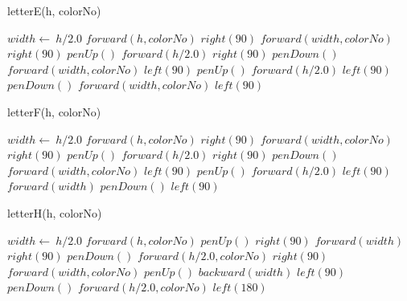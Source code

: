 \documentclass[a4paper,10pt]{article}
\begin{document}
\begin{algorithm}
\caption{letterE(h, colorNo)}
\begin{algorithmic}[5]

\STATE {}
\STATE {}
  \STATE \(width\gets\ h/2.0\)
  \STATE \(forward(h,colorNo)\)
  \STATE \(right(90)\)
  \STATE \(forward(width,colorNo)\)
  \STATE \(right(90)\)
  \STATE \(penUp()\)
  \STATE \(forward(h/2.0)\)
  \STATE \(right(90)\)
  \STATE \(penDown()\)
  \STATE \(forward(width,colorNo)\)
  \STATE \(left(90)\)
  \STATE \(penUp()\)
  \STATE \(forward(h/2.0)\)
  \STATE \(left(90)\)
  \STATE \(penDown()\)
  \STATE \(forward(width,colorNo)\)
  \STATE \(left(90)\)

\end{algorithmic}
\end{algorithm}


\begin{algorithm}
\caption{letterF(h, colorNo)}
\begin{algorithmic}[5]

\STATE {}
\STATE {}
  \STATE \(width\gets\ h/2.0\)
  \STATE \(forward(h,colorNo)\)
  \STATE \(right(90)\)
  \STATE \(forward(width,colorNo)\)
  \STATE \(right(90)\)
  \STATE \(penUp()\)
  \STATE \(forward(h/2.0)\)
  \STATE \(right(90)\)
  \STATE \(penDown()\)
  \STATE \(forward(width,colorNo)\)
  \STATE \(left(90)\)
  \STATE \(penUp()\)
  \STATE \(forward(h/2.0)\)
  \STATE \(left(90)\)
  \STATE \(forward(width)\)
  \STATE \(penDown()\)
  \STATE \(left(90)\)

\end{algorithmic}
\end{algorithm}


\begin{algorithm}
\caption{letterH(h, colorNo)}
\begin{algorithmic}[5]

\STATE {}
\STATE {}
  \STATE \(width\gets\ h/2.0\)
  \STATE \(forward(h,colorNo)\)
  \STATE \(penUp()\)
  \STATE \(right(90)\)
  \STATE \(forward(width)\)
  \STATE \(right(90)\)
  \STATE \(penDown()\)
  \STATE \(forward(h/2.0,colorNo)\)
  \STATE \(right(90)\)
  \STATE \(forward(width,colorNo)\)
  \STATE \(penUp()\)
  \STATE \(backward(width)\)
  \STATE \(left(90)\)
  \STATE \(penDown()\)
  \STATE \(forward(h/2.0,colorNo)\)
  \STATE \(left(180)\)

\end{algorithmic}
\end{algorithm}
\end{document}
